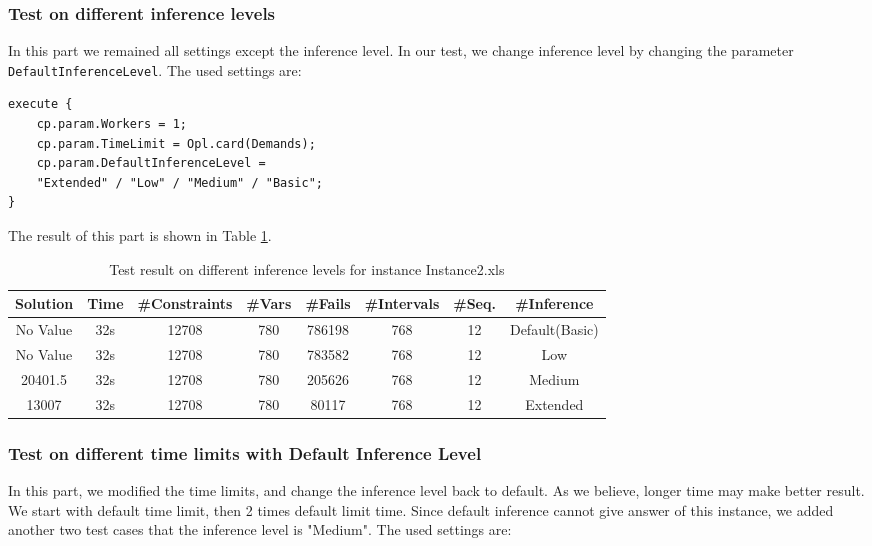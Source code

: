 \documentclass[a4paper, 12pt]{article}
\begin{document}
\subsubsection{Test on different inference levels}

In this part we remained all settings except the inference level. In our test, we change inference level by changing the parameter \texttt{DefaultInferenceLevel}. The used settings are: 

\begin{lstlisting}
execute {
    cp.param.Workers = 1;
    cp.param.TimeLimit = Opl.card(Demands); 
    cp.param.DefaultInferenceLevel = 
    "Extended" / "Low" / "Medium" / "Basic";
}
\end{lstlisting}

The result of this part is shown in Table \ref{diffInfer2}. 

\begin{table}
    \centering
    \caption{Test result on different inference levels for instance Instance2.xls}
    \label{diffInfer2}
    \begin{tabular}{|c|c|c|c|c|c|c|c|}
        \hline
        Solution & Time & \#Constraints & \#Vars & \#Fails & \#Intervals & \#Seq. & \#Inference \\
        \hline
        No Value & 32s & 12708 & 780 & 786198 & 768 & 12 & Default(Basic) \\
        \hline 
        No Value & 32s & 12708 & 780 & 783582 & 768 & 12 & Low \\
        \hline
        20401.5 & 32s & 12708 & 780 & 205626 & 768 & 12 & Medium \\
        \hline
        13007 & 32s & 12708 & 780 & 80117 & 768 & 12 & Extended \\
        \hline
    \end{tabular}
\end{table}

\subsubsection{Test on different time limits with Default Inference Level}

In this part, we modified the time limits, and change the inference level back to default. As we believe, longer time may make better result. We start with default time limit, then 2 times default limit time. Since default inference cannot give answer of this instance, we added another two test cases that the inference level is "Medium". The used settings are: 
\end{document}
